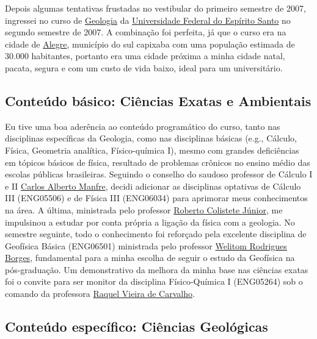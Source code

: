 \documentclass[10pt,a4paper,oneside]{book}
\begin{document}
Depois algumas tentativas frustadas no vestibular do primeiro semestre de 2007, ingressei no curso de \href{https://geologia.ufes.br/}{Geologia} da \href{https://www.ufes.br/}{Universidade Federal do Espírito Santo} no segundo semestre de 2007. A combinação foi perfeita, já que o curso era na cidade de \href{https://alegre.es.gov.br/}{Alegre}, município do sul capixaba com uma população estimada de 30.000 habitantes, portanto era uma cidade próxima a minha cidade natal, pacata, segura e com um custo de vida baixo, ideal para um universitário.

\subsection{Conteúdo básico: Ciências Exatas e Ambientais}
\label{sec_geo_basico}

Eu tive uma boa aderência ao conteúdo programático do curso, tanto nas disciplinas específicas da Geologia, como nas disciplinas básicas (e.g., Cálculo, Física, Geometria analítica, Físico-química I), mesmo com grandes deficiências em tópicos básicos de física, resultado de problemas crônicos no ensino médio das escolas públicas brasileiras. Seguindo o conselho do saudoso professor de Cálculo I e II \href{http://lattes.cnpq.br/8391815843000996}{Carlos Alberto Manfre}, decidi adicionar as disciplinas optativas de Cálculo III (ENG05506) e de Física III (ENG06034) para aprimorar meus conhecimentos na área. A última, ministrada pelo professor \href{http://lattes.cnpq.br/6503578618806955}{Roberto Colistete Júnior}, me impulsinou a estudar por conta própria a ligação da física com a geologia. No semestre seguinte, todo o conhecimento foi reforçado pela excelente disciplina de Geofísica Básica (ENG06501) ministrada pelo professor \href{http://lattes.cnpq.br/0799322864183147}{Welitom Rodrigues Borges}, fundamental para a minha escolha de seguir o estudo da Geofísica na pós-graduação. Um demonstrativo da melhora da minha base nas ciências exatas foi o convite para ser monitor da disciplina Físico-Química I (ENG05264) sob o comando da professora \href{http://lattes.cnpq.br/9146731989810239}{Raquel Vieira de Carvalho}.

\subsection{Conteúdo específico: Ciências Geológicas}
\label{sec_geo_especifico}
\end{document}
